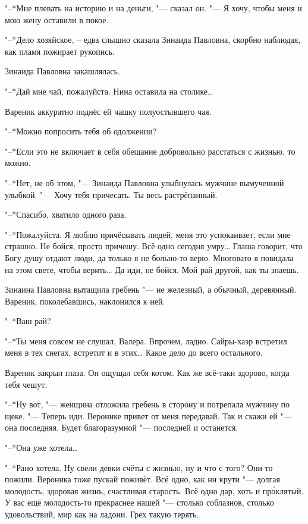 "--*Мне плевать на историю и на деньги, "--- сказал он.
"--- Я хочу, чтобы меня и мою жену оставили в покое.

"--*Дело хозяйское, -- едва слышно сказала Зинаида Павловна, скорбно наблюдая, как пламя пожирает рукопись.

Зинаида Павловна закашлялась.

"--*Дай мне чай, пожалуйста.
Нина оставила на столике\ldots{}

Вареник аккуратно поднёс ей чашку полуостывшего чая.

"--*Можно попросить тебя об одолжении?

"--*Если это не включает в себя обещание добровольно расстаться с жизнью, то можно.

"--*Нет, не об этом, "--- Зинаида Павловна улыбнулась мужчине вымученной улыбкой.
"--- Хочу тебя причесать.
Ты весь растрёпанный.

"--*Спасибо, хватило одного раза.

"--*Пожалуйста.
Я люблю причёсывать людей, меня это успокаивает, если мне страшно.
Не бойся, просто причешу.
Всё одно сегодня умру\ldots{}
Глаша говорит, что Богу душу отдают люди, да только я не больно-то верю.
Многовато я повидала на этом свете, чтобы верить\ldots{}
Да иди, не бойся.
Мой рай другой, как ты знаешь.

Зинаина Павловна вытащила гребень "--- не железный, а обычный, деревянный.
Вареник, поколебавшись, наклонился к ней.

"--*Ваш рай?

"--*Ты меня совсем не слушал, Валера.
Впрочем, ладно.
Сайры-хаэр встретил меня в тех снегах, встретит и в этих\ldots{}
Какое дело до всего остального.

Вареник закрыл глаза.
Он ощущал себя котом.
Как же всё-таки здорово, когда тебя чешут.

"--*Ну вот, "--- женщина отложила гребень в сторону и потрепала мужчину по щеке.
"--- Теперь иди.
Веронике привет от меня передавай.
Так и скажи ей "--- она последняя.
Будет благоразумной "--- последней и останется.

"--*Она уже хотела\ldots{}

"--*Рано хотела.
Ну свели девки счёты с жизнью, ну и что с того?
Они-то пожили.
Вероника тоже пускай поживёт.
Всё одно, как ни крути "--- долгая молодость, здоровая жизнь, счастливая старость.
Всё одно дар, хоть и пр\'оклятый.
У вас ещё молодость-то прекраснее нашей "--- столько соблазнов, столько удовольствий, мир как на ладони.
Грех такую терять.

